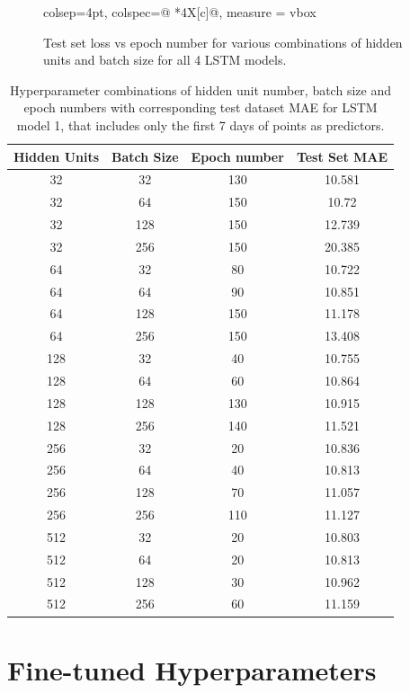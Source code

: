 \documentclass{article}
\begin{document}
\begin{figure}[H]
\begin{adjustwidth}{-1.5cm}{-1.5cm}
\begin{tblr}{colsep=4pt,
             colspec={@{} *{4}{X[c]}@{}}, 
             measure = vbox}
\end{tblr}
        \caption*{Test set loss vs epoch number for various combinations of hidden units and batch size for all 4 LSTM models.}
        \label{fig:hyper}
    \end{adjustwidth}
\end{figure}


\begin{table}[H]
  \centering
  \begin{tabular}{|c|c|c|c|}
    \hline
    \textbf{Hidden Units} & \textbf{Batch Size} & \textbf{Epoch number} & \textbf{Test Set MAE}\\
    \hline
    32&32&130&10.581\\
    32&64&150&10.72\\
    32&128&	150&12.739\\
    32&	256&150&20.385\\
    \hline
    64&32&80&10.722\\
    64&	64&90&10.851\\
    64&128&150&11.178\\
    64&256&150&13.408\\
    \hline
    128	&32&40&10.755\\
    128	&64&60&	10.864\\
    128&128&130&10.915\\
    128	&256&140&11.521\\
    \hline
    256&32&20&10.836\\
    256&64&40&10.813\\
    256&128&70&11.057\\
    256&256&110&11.127\\
    \hline
    512&32&20&10.803\\
    512&64&20&10.813\\
    512&128&30&10.962\\
    512&256&60&11.159\\
    \hline
  \end{tabular}
  \caption*{Hyperparameter combinations of hidden unit number, batch size and epoch numbers with corresponding test dataset MAE for LSTM model 1, that includes only the first 7 days of points as predictors.}
  \label{tab:hyper_combos}
\end{table}

\section{Fine-tuned Hyperparameters}\label{C}
\end{document}
